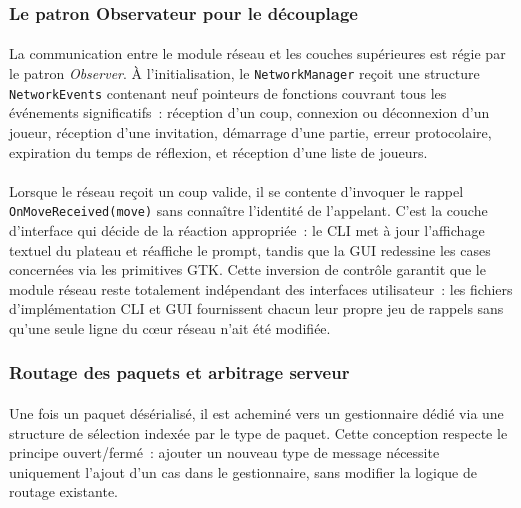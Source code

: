 \documentclass[a4paper]{article}
\begin{document}
\subsubsection{Le patron Observateur pour le découplage}
\label{subsec:observer}
 
\paragraph{}
La communication entre le module réseau et les couches supérieures est régie
par le patron \textit{Observer}. À l'initialisation, le \texttt{NetworkManager}
reçoit une structure \texttt{NetworkEvents} contenant neuf pointeurs de
fonctions couvrant tous les événements significatifs~: réception d'un coup,
connexion ou déconnexion d'un joueur, réception d'une invitation, démarrage
d'une partie, erreur protocolaire, expiration du temps de réflexion, et
réception d'une liste de joueurs.
 
\paragraph{}
Lorsque le réseau reçoit un coup valide, il se contente d'invoquer le rappel
\texttt{OnMoveReceived(move)} sans connaître l'identité de l'appelant. C'est
la couche d'interface qui décide de la réaction appropriée~: le CLI met à jour
l'affichage textuel du plateau et réaffiche le prompt, tandis que la GUI
redessine les cases concernées via les primitives GTK. Cette inversion de
contrôle garantit que le module réseau reste totalement indépendant des
interfaces utilisateur~: les fichiers d'implémentation CLI et GUI fournissent
chacun leur propre jeu de rappels sans qu'une seule ligne du cœur réseau
n'ait été modifiée.
 
\subsubsection{Routage des paquets et arbitrage serveur}
\label{subsec:routing}
 
\paragraph{}
Une fois un paquet désérialisé, il est acheminé vers un gestionnaire dédié
via une structure de sélection indexée par le type de paquet. Cette conception
respecte le principe ouvert/fermé~: ajouter un nouveau type de message
nécessite uniquement l'ajout d'un cas dans le gestionnaire, sans modifier
la logique de routage existante.
\end{document}
